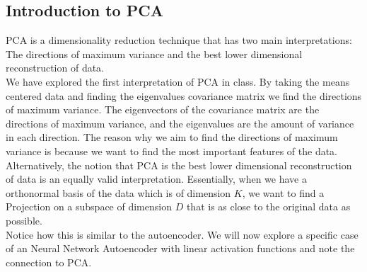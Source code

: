 \documentclass[answers,12pt,addpoints]{exam}
\begin{document}
\subsection{Introduction to PCA}
PCA is a dimensionality reduction technique that has two main interpretations: The directions of maximum variance and the best lower dimensional reconstruction of data. \\
We have explored the first interpretation of PCA in class. By taking the means centered data and finding the eigenvalues covariance matrix we find the directions of maximum variance. The eigenvectors of the covariance matrix are the directions of maximum variance, and the eigenvalues are the amount of variance in each direction. The reason why we aim to find the directions of maximum variance is because we want to find the most important features of the data. \\
Alternatively, the notion that PCA is the best lower dimensional reconstruction of data is an equally valid interpretation. Essentially, when we have a orthonormal basis of the data which is of dimension $K$, we want to find a Projection on a subspace of dimension $D$ that is as close to the original data as possible. \\
Notice how this is similar to the autoencoder. We will now explore a specific case of an Neural Network Autoencoder with linear activation functions and note the connection to PCA. 
\end{document}
